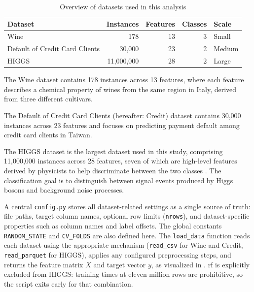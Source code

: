 \begin{table}[htbp]
\centering
\caption{Overview of datasets used in this analysis}
\label{tab:datasets}
\begin{tabular}{lrrrl}
\toprule
\textbf{Dataset} & \textbf{Instances} & \textbf{Features} & \textbf{Classes} & \textbf{Scale} \\
\midrule
Wine \cite{stefanaeberhardWine1992} & 178 & 13 & 3 & Small \\
Default of Credit Card Clients \cite{i-chengyehDefaultCreditCard2009} & 30,000 & 23 & 2 & Medium \\
HIGGS \cite{whitesonHIGGS2014} & 11,000,000 & 28 & 2 & Large \\
\bottomrule
\end{tabular}
\end{table}

The Wine \parencite{stefanaeberhardWine1992} dataset contains 178 instances across 13 features, where each feature describes a chemical property of wines from the same region in Italy, derived from three different cultivars.

The Default of Credit Card Clients \parencite{i-chengyehDefaultCreditCard2009} (hereafter: Credit) dataset contains 30,000 instances across 23 features and focuses on predicting payment default among credit card clients in Taiwan.

The HIGGS \parencite{whitesonHIGGS2014} dataset is the largest dataset used in this study, comprising 11,000,000 instances across 28 features, seven of which are high-level features derived by physicists to help discriminate between the two classes \cite{baldiSearchingExoticParticles2014}. The classification goal is to distinguish between signal events produced by Higgs bosons and background noise processes.

A central \texttt{config.py} stores all dataset-related settings as a single source of truth: file paths, target column names, optional row limits (\texttt{nrows}), and dataset-specific properties such as column names and label offsets. The global constants \texttt{RANDOM\_STATE} and \texttt{CV\_FOLDS} are also defined here. The \texttt{load\_data} function reads each dataset using the appropriate mechanism (\texttt{read\_csv} for Wine and Credit, \texttt{read\_parquet} for HIGGS), applies any configured preprocessing steps, and returns the feature matrix $X$ and target vector $y$, as visualized in . \gls{rf} is explicitly excluded from HIGGS: training times at eleven million rows are prohibitive, so the script exits early for that combination.

